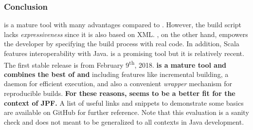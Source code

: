 \documentclass{article}
\begin{document}
\subsubsection*{Conclusion}
\maven{} is a mature tool with many advantages compared to \ant{}.
However, the build script lacks \emph{expressiveness} since it is also based on
XML.
\sbt{}, on the other hand, empowers the developer by specifying the build
process with real code.
In addition, Scala features interoperability with Java.
\sbt{} is a promising tool but it is relatively recent.
The first stable release is from February 9\textsuperscript{th},
2018\cite{page:sbt-release}.
\textbf{\gradle{} is a mature tool and combines the best of \maven{} and \sbt{}}
including features like incremental building, a daemon for efficient
execution\cite{page:gradle-daemon}, and also a convenient \emph{wrapper}
mechanism\cite{page:gradle-wrapper} for reproducible builds.
\textbf{For these reasons, \gradle{} seems to be a better fit for the context
of JPF.}
A list of useful links and snippets to demonstrate some \gradle{} basics are
available on GitHub\cite{page:gradle-labs} for further reference. 
Note that this evaluation is a sanity check and does not meant to be
generalized to all contexts in Java development.

\clearpage


\end{document}
